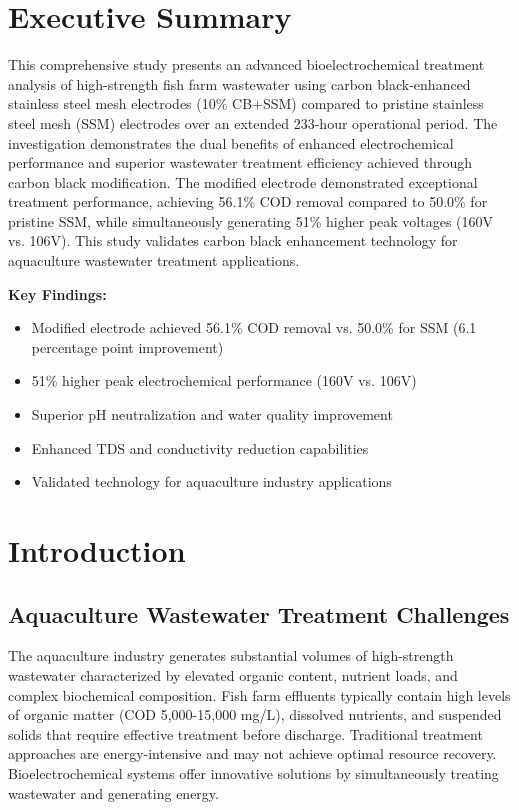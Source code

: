 \documentclass[12pt,a4paper]{article}
\begin{document}
\newpage

\tableofcontents
\newpage


\section{Executive Summary}

This comprehensive study presents an advanced bioelectrochemical treatment analysis of high-strength fish farm wastewater using carbon black-enhanced stainless steel mesh electrodes (10\% CB+SSM) compared to pristine stainless steel mesh (SSM) electrodes over an extended 233-hour operational period. The investigation demonstrates the dual benefits of enhanced electrochemical performance and superior wastewater treatment efficiency achieved through carbon black modification. The modified electrode demonstrated exceptional treatment performance, achieving 56.1\% COD removal compared to 50.0\% for pristine SSM, while simultaneously generating 51\% higher peak voltages (160V vs. 106V). This study validates carbon black enhancement technology for aquaculture wastewater treatment applications.

\textbf{Key Findings:}
\begin{itemize}
    \item Modified electrode achieved 56.1\% COD removal vs. 50.0\% for SSM (6.1 percentage point improvement)
    \item 51\% higher peak electrochemical performance (160V vs. 106V)
    \item Superior pH neutralization and water quality improvement
    \item Enhanced TDS and conductivity reduction capabilities
    \item Validated technology for aquaculture industry applications
\end{itemize}

\section{Introduction}

\subsection{Aquaculture Wastewater Treatment Challenges}

The aquaculture industry generates substantial volumes of high-strength wastewater characterized by elevated organic content, nutrient loads, and complex biochemical composition. Fish farm effluents typically contain high levels of organic matter (COD 5,000-15,000 mg/L), dissolved nutrients, and suspended solids that require effective treatment before discharge. Traditional treatment approaches are energy-intensive and may not achieve optimal resource recovery. Bioelectrochemical systems offer innovative solutions by simultaneously treating wastewater and generating energy.
\end{document}
